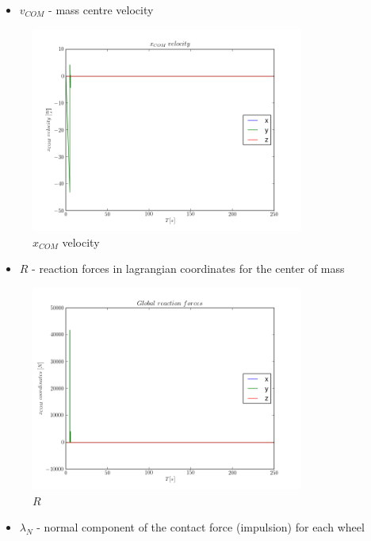 \begin{itemize}
  \item $v_{COM}$ - mass centre velocity
\end{itemize}

\begin{figure}[H]
  \centering
    \includegraphics[width=0.8\textwidth]{vCOM}
  \caption{$x_{COM}$ velocity}
\end{figure}

\begin{itemize}
  \item $R$ - reaction forces in lagrangian coordinates for the center of mass
\end{itemize}

\begin{figure}[H]
  \centering
    \includegraphics[width=0.8\textwidth]{p}
  \caption{$R$}
\end{figure}

\begin{itemize}
  \item $\lambda_{N}$ - normal component of the contact force (impulsion) for each wheel
\end{itemize}

